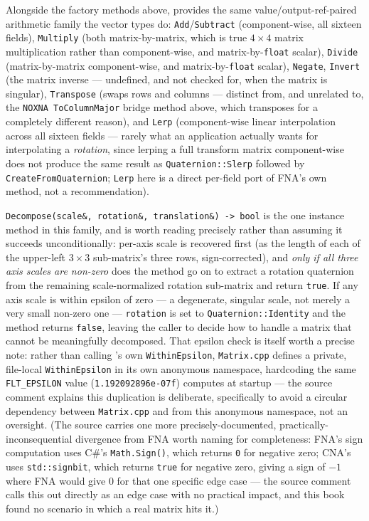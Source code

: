 Alongside the factory methods above,  provides the same
value/output-ref-paired arithmetic family the vector types do: \texttt{Add}/\texttt{Subtract}
(component-wise, all sixteen fields), \texttt{Multiply} (both matrix-by-matrix, which is true
$4\times4$ matrix multiplication rather than component-wise, and matrix-by-\texttt{float}
scalar), \texttt{Divide} (matrix-by-matrix component-wise, and matrix-by-\texttt{float}
scalar), \texttt{Negate}, \texttt{Invert} (the matrix inverse --- undefined, and not checked
for, when the matrix is singular), \texttt{Transpose} (swaps rows and columns --- distinct
from, and unrelated to, the \texttt{NOXNA ToColumnMajor} bridge method above, which transposes
for a completely different reason), and \texttt{Lerp} (component-wise linear interpolation
across all sixteen fields --- rarely what an application actually wants for interpolating a
\emph{rotation}, since lerping a full transform matrix component-wise does not produce the same
result as \texttt{Quaternion::Slerp} followed by \texttt{CreateFromQuaternion}; \texttt{Lerp}
here is a direct per-field port of FNA's own method, not a recommendation).

\texttt{Decompose(scale\&, rotation\&, translation\&) -> bool} is the one instance method in
this family, and is worth reading precisely rather than assuming it succeeds unconditionally:
per-axis scale is recovered first (as the length of each of the upper-left $3\times3$
sub-matrix's three rows, sign-corrected), and \emph{only if all three axis scales are
non-zero} does the method go on to extract a rotation quaternion from the remaining
scale-normalized rotation sub-matrix and return \texttt{true}. If any axis scale is within epsilon of zero --- a degenerate, singular scale, not merely a
very small non-zero one --- \texttt{rotation} is set to \texttt{Quaternion::Identity} and the
method returns \texttt{false}, leaving the caller to decide how to handle a matrix that cannot
be meaningfully decomposed. That epsilon check is itself worth a precise note: rather than
calling 's own \texttt{WithinEpsilon}, \texttt{Matrix.cpp} defines a
private, file-local \texttt{WithinEpsilon} in its own anonymous namespace, hardcoding the same
\texttt{FLT\_EPSILON} value (\texttt{1.192092896e-07f})  computes at
startup --- the source comment explains this duplication is deliberate, specifically to avoid
a circular dependency between \texttt{Matrix.cpp} and  from this
anonymous namespace, not an oversight. (The source carries one more precisely-documented,
practically-inconsequential divergence from FNA worth naming for completeness: FNA's sign
computation uses C\#'s \texttt{Math.Sign()}, which returns \texttt{0} for negative zero; CNA's
uses \texttt{std::signbit}, which returns \texttt{true} for negative zero, giving a
sign of $-1$ where FNA would give $0$ for that one specific edge case --- the source comment
calls this out directly as an edge case with no practical impact, and this book found no
scenario in which a real matrix hits it.)

